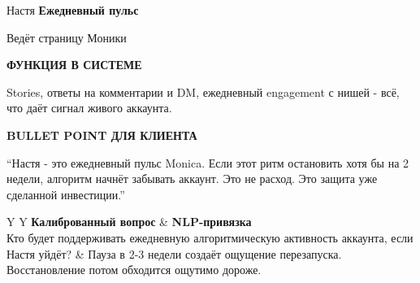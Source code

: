 \documentclass[11pt,a4paper]{article}
\newcommand{\minititle}[1]{{\sansfont\bfseries\fontsize{9.5}{11}\selectfont\color{rose}\MakeUppercase{#1}}}
\begin{document}
\begin{glassbox}
{\headingfont\fontsize{18}{20}\selectfont Настя}\hfill
{\sansfont\bfseries\color{emerald} Ежедневный пульс}

{\color{muted} Ведёт страницу Моники}

\vspace{2mm}
\begin{softbox}[colback=paperbg]
\minititle{Функция в системе}\par
Stories, ответы на комментарии и DM, ежедневный engagement с нишей - всё, что даёт сигнал живого аккаунта.
\end{softbox}
\vspace{2mm}
\begin{softbox}[colback=paperbg]
\minititle{Bullet Point для клиента}\par
``Настя - это ежедневный пульс Monica. Если этот ритм остановить хотя бы на 2 недели, алгоритм начнёт забывать аккаунт. Это не расход. Это защита уже сделанной инвестиции.''
\end{softbox}
\vspace{2mm}
\begin{tabularx}{\linewidth}{Y Y}
\textbf{Калиброванный вопрос} & \textbf{NLP-привязка} \\
Кто будет поддерживать ежедневную алгоритмическую активность аккаунта, если Настя уйдёт? & Пауза в 2-3 недели создаёт ощущение перезапуска. Восстановление потом обходится ощутимо дороже. \\
\end{tabularx}
\end{glassbox}

\vspace{3mm}
\end{document}
